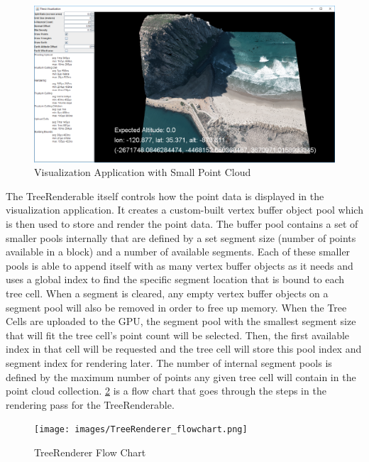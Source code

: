 \begin{figure}[htp]
\begin{center}
  \includegraphics[width=.9\linewidth]{images/visualization.png}
  \caption{Visualization Application with Small Point Cloud}
  \label{fig:visualization}
\end{center}
\end{figure}

The TreeRenderable itself controls how the point data is
displayed in the visualization application. It creates a custom-built vertex
buffer object pool which is then used to store and render the point data. The
buffer pool contains a set of smaller pools internally that are defined by a set
segment size (number of points available in a block) and a number of available
segments. Each of these smaller pools is able to append itself with as many
vertex buffer objects as it needs and uses a global index to find the specific
segment location that is bound to each tree cell. When a segment is cleared, any
empty vertex buffer objects on a segment pool will also be removed in order to
free up memory. When the Tree Cells are uploaded to the GPU, the segment pool
with the smallest segment size that will fit the tree cell's point count will be
selected. Then, the first available index in that cell will be requested and the
tree cell will store this pool index and segment index for rendering later. The
number of internal segment pools is defined by the maximum number of points any
given tree cell will contain in the point cloud collection. \ref{fig:flowchart}
is a flow chart that goes through the steps in the rendering pass for the TreeRenderable.

\begin{figure}[htp]
\begin{center}
  \texttt{[image: images/TreeRenderer\_flowchart.png]}
  \caption{TreeRenderer Flow Chart}
  \label{fig:flowchart}
\end{center}
\end{figure}

